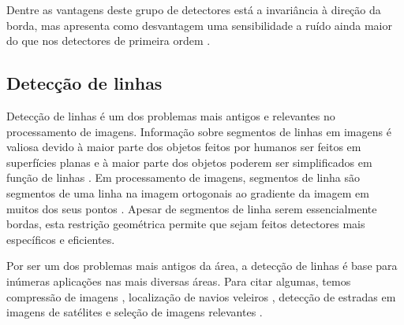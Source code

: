 Dentre as vantagens deste grupo de detectores está a invariância à direção da borda, mas apresenta como desvantagem uma sensibilidade a ruído ainda maior do que nos detectores de primeira ordem \cite{comparaborda}.

\subsection{Detecção de linhas} \label{funt:proclin}




Detecção de linhas é um dos problemas mais antigos e relevantes no processamento de imagens. Informação sobre segmentos de linhas em imagens é valiosa devido à maior parte dos objetos feitos por humanos ser feitos em superfícies planas e à maior parte dos objetos poderem ser simplificados em função de linhas \cite{linha00}. Em processamento de imagens, segmentos de linha são segmentos de uma linha na imagem ortogonais ao gradiente da imagem em muitos dos seus pontos \cite{linha01}. Apesar de segmentos de linha serem essencialmente bordas, esta restrição geométrica permite que sejam feitos detectores mais específicos e eficientes.

Por ser um dos problemas mais antigos da área, a detecção de linhas é base para inúmeras aplicações nas mais diversas áreas. Para citar algumas, temos compressão de imagens \cite{linhacompress}, localização de navios veleiros \cite{linhanavio}, detecção de estradas em imagens de satélites \cite{linhasestrada} e seleção de imagens relevantes \cite{linhasselecao}.



